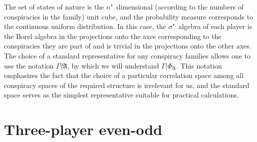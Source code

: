 The set of states of nature is the $n$"~dimensional (according to the numbers of conspiracies in the family) unit cube, and the probability measure corresponds to the continuous uniform distribution. In this case, the $\sigma$"~algebra of each player is the Borel algebra in the projections onto the axes corresponding to the conspiracies they are part of and is trivial in the projections onto the other axes. The choice of a standard representative for any conspiracy families allows one to use the notation $\Gamma | \mathfrak{A}$, by which we will understand $\Gamma | \Phi_{\mathfrak{A}}$. This notation emphasizes the fact that the choice of a particular correlation space among all conspiracy spaces of the required structure is irrelevant for us, and the standard space serves as the simplest representative suitable for practical calculations. %

\section{Three-player even-odd}\label{sec:ch1/sec4}

